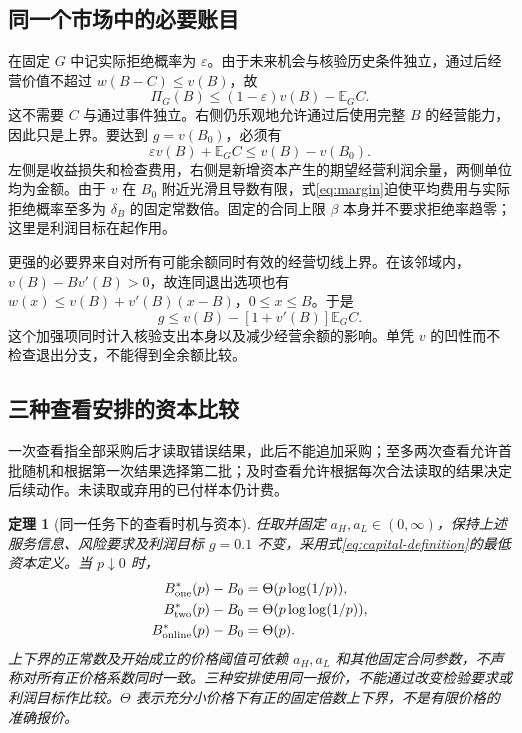 \documentclass[UTF8,fontset=windows,11pt,a4paper]{ctexart}
\newtheorem{theorem}{定理}
\numberwithin{equation}{section}
\begin{document}
\subsection{同一个市场中的必要账目}
在固定 $G$ 中记实际拒绝概率为 $\varepsilon$。由于未来机会与核验历史条件独立，通过后经营价值不超过 $w(B-C)\le v(B)$，故
\begin{equation}\label{eq:easy}
 \Pi_G(B)\le(1-\varepsilon)v(B)-\mathbb E_G C.
\end{equation}
这不需要 $C$ 与通过事件独立。右侧仍乐观地允许通过后使用完整 $B$ 的经营能力，因此只是上界。要达到 $g=v(B_0)$，必须有
\begin{equation}\label{eq:margin}
 \varepsilon v(B)+\mathbb E_G C\le v(B)-v(B_0).
\end{equation}
左侧是收益损失和检查费用，右侧是新增资本产生的期望经营利润余量，两侧单位均为金额。由于 $v$ 在 $B_0$ 附近光滑且导数有限，式\eqref{eq:margin}迫使平均费用与实际拒绝概率至多为 $\delta_B$ 的固定常数倍。固定的合同上限 $\beta$ 本身并不要求拒绝率趋零；这里是利润目标在起作用。

更强的必要界来自对所有可能余额同时有效的经营切线上界。在该邻域内，$v(B)-Bv'(B)>0$，故连同退出选项也有 $w(x)\le v(B)+v'(B)(x-B)$，$0\le x\le B$。于是
\begin{equation}
 g\le v(B)-[1+v'(B)]\mathbb E_G C.
\end{equation}
这个加强项同时计入核验支出本身以及减少经营余额的影响。单凭 $v$ 的凹性而不检查退出分支，不能得到全余额比较。

\subsection{三种查看安排的资本比较}
一次查看指全部采购后才读取错误结果，此后不能追加采购；至多两次查看允许首批随机和根据第一次结果选择第二批；及时查看允许根据每次合法读取的结果决定后续动作。未读取或弃用的已付样本仍计费。

\begin{theorem}[同一任务下的查看时机与资本]
任取并固定 $a_H,a_L\in(0,\infty)$，保持上述服务信息、风险要求及利润目标 $g=0.1$ 不变，采用式\eqref{eq:capital-definition}的最低资本定义。当 $p\downarrow0$ 时，
\begin{align}
 B_{\rm one}^*(p)-B_0&=\Theta(p\log(1/p)),\\
 B_{\rm two}^*(p)-B_0&=\Theta(p\log\log(1/p)),\\
 B_{\rm online}^*(p)-B_0&=\Theta(p).
\end{align}
上下界的正常数及开始成立的价格阈值可依赖 $a_H,a_L$ 和其他固定合同参数，不声称对所有正价格系数同时一致。三种安排使用同一报价，不能通过改变检验要求或利润目标作比较。$\Theta$ 表示充分小价格下有正的固定倍数上下界，不是有限价格的准确报价。
\end{theorem}
\end{document}
